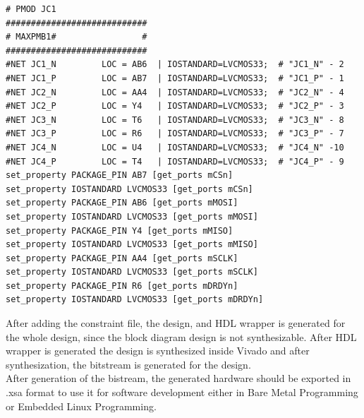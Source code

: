 \begin{verbatim}
# PMOD JC1
############################
# MAXPMB1#                 #
############################
#NET JC1_N         LOC = AB6  | IOSTANDARD=LVCMOS33;  # "JC1_N" - 2
#NET JC1_P         LOC = AB7  | IOSTANDARD=LVCMOS33;  # "JC1_P" - 1
#NET JC2_N         LOC = AA4  | IOSTANDARD=LVCMOS33;  # "JC2_N" - 4
#NET JC2_P         LOC = Y4   | IOSTANDARD=LVCMOS33;  # "JC2_P" - 3
#NET JC3_N         LOC = T6   | IOSTANDARD=LVCMOS33;  # "JC3_N" - 8
#NET JC3_P         LOC = R6   | IOSTANDARD=LVCMOS33;  # "JC3_P" - 7
#NET JC4_N         LOC = U4   | IOSTANDARD=LVCMOS33;  # "JC4_N" -10
#NET JC4_P         LOC = T4   | IOSTANDARD=LVCMOS33;  # "JC4_P" - 9
set_property PACKAGE_PIN AB7 [get_ports mCSn]
set_property IOSTANDARD LVCMOS33 [get_ports mCSn]
set_property PACKAGE_PIN AB6 [get_ports mMOSI]
set_property IOSTANDARD LVCMOS33 [get_ports mMOSI]
set_property PACKAGE_PIN Y4 [get_ports mMISO]
set_property IOSTANDARD LVCMOS33 [get_ports mMISO]
set_property PACKAGE_PIN AA4 [get_ports mSCLK]
set_property IOSTANDARD LVCMOS33 [get_ports mSCLK]
set_property PACKAGE_PIN R6 [get_ports mDRDYn]
set_property IOSTANDARD LVCMOS33 [get_ports mDRDYn]

\end{verbatim}

After adding the constraint file, the design, and HDL wrapper is generated for the whole design, since the block diagram design is not synthesizable. After HDL wrapper is generated the design is synthesized inside Vivado and after synthesization, the bitstream is generated for the design. \\
After generation of the bistream, the generated hardware should be exported in .xsa format to use it for software development either in Bare Metal Programming or Embedded Linux Programming. 
